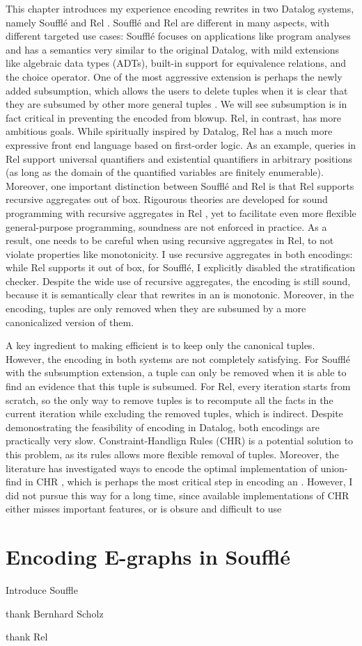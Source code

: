 This chapter introduces my experience encoding \egraph rewrites 
 in two Datalog systems, namely Souffl\'e \citep{souffle} and Rel \citep{rel-doc}.
Souffl\'e and Rel are different in many aspects, with different targeted use cases:
 Souffl\'e focuses on applications like program analyses
 and has a semantics very similar to the original Datalog,
 with mild extensions like algebraic data types (ADTs),
 built-in support for equivalence relations, and the choice operator.
One of the most aggressive extension is perhaps
 the newly added subsumption,
 which allows the users to delete tuples 
 when it is clear that they are subsumed by other more general tuples \citep{datalog-subsumption}.
We will see subsumption is in fact critical in preventing the encoded \egraphs from blowup.
Rel, in contrast, has more ambitious goals.
While spiritually inspired by Datalog, 
 Rel has a much more expressive front end language based on first-order logic.
As an example, 
 queries in Rel support universal quantifiers and existential quantifiers in arbitrary positions
 (as long as the domain of the quantified variables are finitely enumerable).
Moreover,
 one important distinction between Souffl\'e and Rel is
 that Rel supports recursive aggregates out of box.
Rigourous theories are developed 
 for sound programming with recursive aggregates in Rel \citep{datalogo-convergence},
 yet to facilitate even more flexible general-purpose programming,
 soundness are not enforced in practice.
As a result,
 one needs to be careful when using recursive aggregates in Rel,
 to not violate properties like monotonicity.
I use recursive aggregates in both encodings:
 while Rel supports it out of box, 
 for Souffl\'e, I explicitly disabled the stratification checker.
Despite the wide use of recursive aggregates, the encoding is still sound,
 because it is semantically clear that rewrites in an \egraph is monotonic.
Moreover, in the encoding,
 tuples are only removed when they are subsumed by a more canonicalized version of them.

A key ingredient to making \egraph efficient is 
 to keep only the canonical tuples.
However, the encoding in both systems are not completely satisfying.
For Souffl\'e with the subsumption extension,
 a tuple can only be removed when it is able to find an evidence 
 that this tuple is subsumed.
For Rel, every iteration starts from scratch,
 so the only way to remove tuples is 
 to recompute all the facts in the current iteration while excluding the removed tuples,
 which is indirect.
Despite demonostrating the feasibility of encoding \egraphs in Datalog, 
 both encodings are practically very slow.
Constraint-Handlign Rules (CHR) \citep{chr} is a potential solution to this problem,
 as its rules allows more flexible removal of tuples.
Moreover,
 the literature has investigated 
 ways to encode the optimal implementation of union-find in CHR \citep{uf-chr},
 which is perhaps the most critical step in encoding an \egraph.
However, I did not pursue this way for a long time, 
 since available implementations of CHR either misses important features,
 or is obsure and difficult to use

\section{Encoding E-graphs in Souffl\'e}

Introduce Souffle

thank Bernhard Scholz

thank Rel